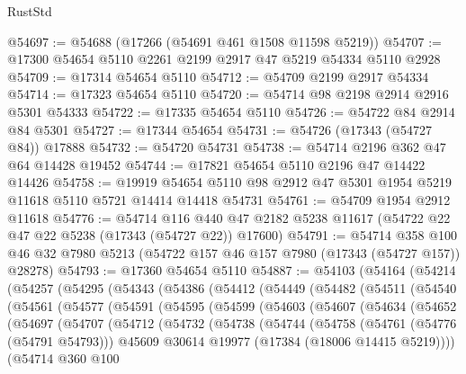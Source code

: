 \begin{lexlean}{RustStd}
\begin{coremodule}
@54697 := @54688 (@17266 (@54691 @461 @1508 @11598 @5219))
@54707 := @17300 @54654 @5110 @2261 @2199 @2917 @47 @5219 @54334 @5110 @2928
@54709 := @17314 @54654 @5110
@54712 := @54709 @2199 @2917 @54334
@54714 := @17323 @54654 @5110
@54720 := @54714 @98 @2198 @2914 @2916 @5301 @54333
@54722 := @17335 @54654 @5110
@54726 := @54722 @84 @2914 @84 @5301
@54727 := @17344 @54654
@54731 := @54726 (@17343 (@54727 @84)) @17888
@54732 := @54720 @54731
@54738 := @54714 @2196 @362 @47 @64 @14428 @19452
@54744 := @17821 @54654 @5110 @2196 @47 @14422 @14426
@54758 := @19919
    @54654
    @5110
    @98
    @2912
    @47
    @5301
    @1954
    @5219
    @11618
    @5110
    @5721
    @14414
    @14418
    @54731
@54761 := @54709 @1954 @2912 @11618
@54776 := @54714
    @116
    @440
    @47
    @2182
    @5238
    @11617
    (@54722 @22 @47 @22 @5238 (@17343 (@54727 @22)) @17600)
@54791 := @54714
    @358
    @100
    @46
    @32
    @7980
    @5213
    (@54722 @157 @46 @157 @7980 (@17343 (@54727 @157)) @28278)
@54793 := @17360 @54654 @5110
@54887 := @54103
    (@54164
      (@54214
        (@54257
          (@54295
            (@54343
              (@54386
                (@54412
                  (@54449
                    (@54482
                      (@54511
                        (@54540
                          (@54561
                            (@54577
                              (@54591
                                (@54595
                                  (@54599
                                    (@54603
                                      (@54607
                                        (@54634
                                          (@54652
                                            (@54697
                                              (@54707
                                                (@54712
                                                  (@54732
                                                    (@54738
                                                      (@54744
                                                        (@54758
                                                          (@54761 (@54776 (@54791 @54793)))
                                                          @45609
                                                          @30614
                                                          @19977
                                                          (@17384 (@18006 @14415 @5219))))
                                                      (@54714
                                                        @360
                                                        @100

\end{coremodule}
\end{lexlean}

